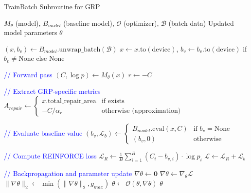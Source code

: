 \documentclass[AutoFakeBold]{LZUThesis}
\begin{document}
\begin{algorithm}[h]
	\begin{algorithmic}[1]
		\caption{TrainBatch Subroutine for GRP}
		\label{alg:grp_batch_training}
		\Require $M_{\theta}$ (model), $B_{model}$ (baseline model), $\mathcal{O}$ (optimizer), $\mathcal{B}$ (batch data)
		\Ensure Updated model parameters $\theta$

		\State $(x, b_v) \leftarrow B_{model}.\text{unwrap\_batch}(\mathcal{B})$
		\State $x \leftarrow x.\text{to}(\text{device})$, $b_v \leftarrow b_v.\text{to}(\text{device})$ if $b_v \neq \text{None}$ else $\text{None}$

		\State \textcolor{blue}{// Forward pass}
		\State $(C, \log p) \leftarrow M_{\theta}(x)$ 
		\State $r \leftarrow -C$ 

		\State \textcolor{blue}{// Extract GRP-specific metrics}
		\State $A_{repair} \leftarrow \begin{cases}
				x.\text{total\_repair\_area} & \text{if exists}                 \\
				-C / \alpha_{r}              & \text{otherwise (approximation)}
			\end{cases}$
		\EndIf

		\State \textcolor{blue}{// Evaluate baseline value}
		\State $(b_v, \mathcal{L}_{b}) \leftarrow \begin{cases}
				B_{model}.\text{eval}(x, C) & \text{if } b_v = \text{None} \\
				(b_v, 0)                    & \text{otherwise}
			\end{cases}$

		\State \textcolor{blue}{// Compute REINFORCE loss}
		\State $\mathcal{L}_{R} \leftarrow \frac{1}{B}\sum_{i=1}^{B}(C_i - b_{v,i}) \cdot \log p_i$
		\State $\mathcal{L} \leftarrow \mathcal{L}_{R} + \mathcal{L}_{b}$ 

		\State \textcolor{blue}{// Backpropagation and parameter update}
		\State $\nabla\theta \leftarrow \mathbf{0}$ 
		\State $\nabla\theta \leftarrow \nabla_{\theta}\mathcal{L}$ 
		\State $\|\nabla\theta\|_2 \leftarrow \min(\|\nabla\theta\|_2, g_{max})$ 
		\State $\theta \leftarrow \mathcal{O}(\theta, \nabla\theta)$ 
		\State \Return $\theta$
	\end{algorithmic}
\end{algorithm}
\end{document}

